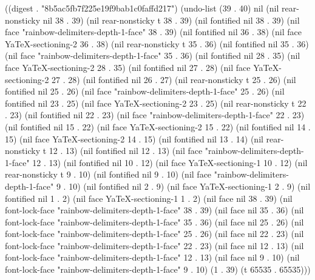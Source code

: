 
((digest . "8b5ac5fb7f225e19f9bab1c0faffd217") (undo-list (39 . 40) nil (nil rear-nonsticky nil 38 . 39) (nil rear-nonsticky t 38 . 39) (nil fontified nil 38 . 39) (nil face "rainbow-delimiters-depth-1-face" 38 . 39) (nil fontified nil 36 . 38) (nil face YaTeX-sectioning-2 36 . 38) (nil rear-nonsticky t 35 . 36) (nil fontified nil 35 . 36) (nil face "rainbow-delimiters-depth-1-face" 35 . 36) (nil fontified nil 28 . 35) (nil face YaTeX-sectioning-2 28 . 35) (nil fontified nil 27 . 28) (nil face YaTeX-sectioning-2 27 . 28) (nil fontified nil 26 . 27) (nil rear-nonsticky t 25 . 26) (nil fontified nil 25 . 26) (nil face "rainbow-delimiters-depth-1-face" 25 . 26) (nil fontified nil 23 . 25) (nil face YaTeX-sectioning-2 23 . 25) (nil rear-nonsticky t 22 . 23) (nil fontified nil 22 . 23) (nil face "rainbow-delimiters-depth-1-face" 22 . 23) (nil fontified nil 15 . 22) (nil face YaTeX-sectioning-2 15 . 22) (nil fontified nil 14 . 15) (nil face YaTeX-sectioning-2 14 . 15) (nil fontified nil 13 . 14) (nil rear-nonsticky t 12 . 13) (nil fontified nil 12 . 13) (nil face "rainbow-delimiters-depth-1-face" 12 . 13) (nil fontified nil 10 . 12) (nil face YaTeX-sectioning-1 10 . 12) (nil rear-nonsticky t 9 . 10) (nil fontified nil 9 . 10) (nil face "rainbow-delimiters-depth-1-face" 9 . 10) (nil fontified nil 2 . 9) (nil face YaTeX-sectioning-1 2 . 9) (nil fontified nil 1 . 2) (nil face YaTeX-sectioning-1 1 . 2) (nil face nil 38 . 39) (nil font-lock-face "rainbow-delimiters-depth-1-face" 38 . 39) (nil face nil 35 . 36) (nil font-lock-face "rainbow-delimiters-depth-1-face" 35 . 36) (nil face nil 25 . 26) (nil font-lock-face "rainbow-delimiters-depth-1-face" 25 . 26) (nil face nil 22 . 23) (nil font-lock-face "rainbow-delimiters-depth-1-face" 22 . 23) (nil face nil 12 . 13) (nil font-lock-face "rainbow-delimiters-depth-1-face" 12 . 13) (nil face nil 9 . 10) (nil font-lock-face "rainbow-delimiters-depth-1-face" 9 . 10) (1 . 39) (t 65535 . 65535)))
